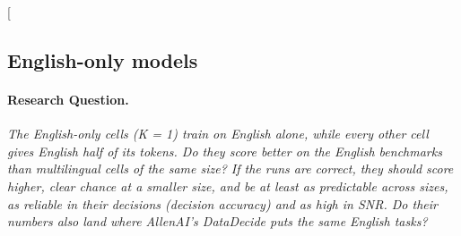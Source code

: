 \clearpage
\twocolumn[{%
\rqparent
\subsection{English-only models}
\label{app:rq13_english_only}

\noindent\begin{minipage}[t]{0.485\textwidth}
\vspace{0pt}
\paragraph{Research Question.} \emph{The English-only cells (K = 1) train on English alone, while every other cell gives English half of its tokens. Do they score better on the English benchmarks than multilingual cells of the same size? If the runs are correct, they should score higher, clear chance at a smaller size, and be at least as predictable across sizes, as reliable in their decisions (decision accuracy) and as high in SNR. Do their numbers also land where AllenAI's DataDecide puts the same English tasks?}


\end{minipage}}
